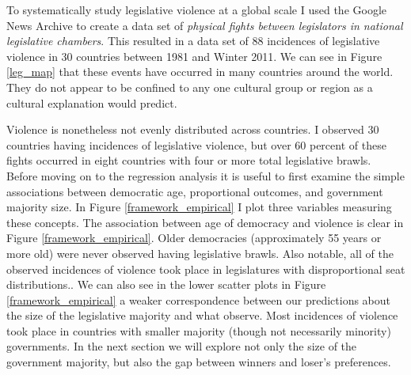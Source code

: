\documentclass[a4paper]{article}\usepackage{graphicx, color}
\begin{document}
To systematically study legislative violence at a global scale I used the Google News Archive to create a data set of {\emph{physical fights between legislators in national legislative chambers}}. This resulted in a data set of 88 incidences of legislative violence in 30 countries between 1981 and Winter 2011. We can see in Figure \ref{leg_map} that these events have occurred in many countries around the world. They do not appear to be confined to any one cultural group or region as a cultural explanation would predict. 

Violence is nonetheless not evenly distributed across countries. I observed 30 countries having incidences of legislative violence, but over 60 percent of these fights occurred in eight countries with four or more total legislative brawls. Before moving on to the regression analysis it is useful to first examine the simple associations between democratic age, proportional outcomes, and government majority size. In Figure \ref{framework_empirical} I plot three variables measuring these concepts. The association between age of democracy and violence is clear in Figure \ref{framework_empirical}. Older democracies (approximately 55 years or more old) were never observed having legislative brawls. Also notable, all of the observed incidences of violence took place in legislatures with disproportional seat distributions.. We can also see in the lower scatter plots in Figure \ref{framework_empirical} a weaker correspondence between our predictions about the size of the legislative majority and what observe. Most incidences of violence took place in countries with smaller majority (though not necessarily minority) governments. In the next section we will explore not only the size of the government majority, but also the gap between winners and loser's preferences.  
\end{document}

